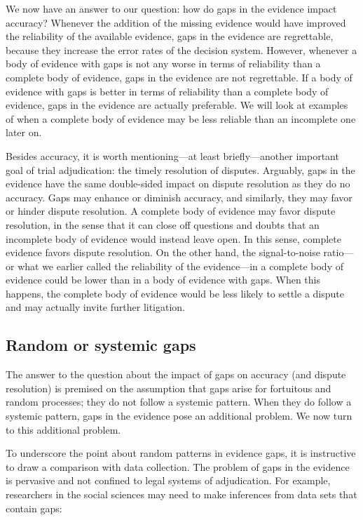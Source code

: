 \documentclass[
  10pt,
  dvipsnames,enabledeprecatedfontcommands]{scrartcl}
\begin{document}
We now have an answer to our question: how do gaps in the evidence
impact accuracy? Whenever the addition of the missing evidence would
have improved the reliability of the available evidence, gaps in the
evidence are regrettable, because they increase the error rates of the
decision system. However, whenever a body of evidence with gaps is not
any worse in terms of reliability than a complete body of evidence, gaps
in the evidence are not regrettable. If a body of evidence with gaps is
better in terms of reliability than a complete body of evidence, gaps in
the evidence are actually preferable. We will look at examples of when a
complete body of evidence may be less reliable than an incomplete one
later on.

Besides accuracy, it is worth mentioning---at least briefly---another
important goal of trial adjudication: the timely resolution of disputes.
Arguably, gaps in the evidence have the same double-sided impact on
dispute resolution as they do no accuracy. Gaps may enhance or diminish
accuracy, and similarly, they may favor or hinder dispute resolution. A
complete body of evidence may favor dispute resolution, in the sense
that it can close off questions and doubts that an incomplete body of
evidence would instead leave open. In this sense, complete evidence
favors dispute resolution. On the other hand, the signal-to-noise
ratio---or what we earlier called the reliability of the evidence---in a
complete body of evidence could be lower than in a body of evidence with
gaps. When this happens, the complete body of evidence would be less
likely to settle a dispute and may actually invite further litigation.

\hypertarget{random-or-systemic-gaps}{%
\subsection{Random or systemic gaps}\label{random-or-systemic-gaps}}

The answer to the question about the impact of gaps on accuracy (and
dispute resolution) is premised on the assumption that gaps arise for
fortuitous and random processes; they do not follow a systemic pattern.
When they do follow a systemic pattern, gaps in the evidence pose an
additional problem. We now turn to this additional problem.

To underscore the point about random patterns in evidence gaps, it is
instructive to draw a comparison with data collection. The problem of
gaps in the evidence is pervasive and not confined to legal systems of
adjudication. For example, researchers in the social sciences may need
to make inferences from data sets that contain gaps:
\end{document}
